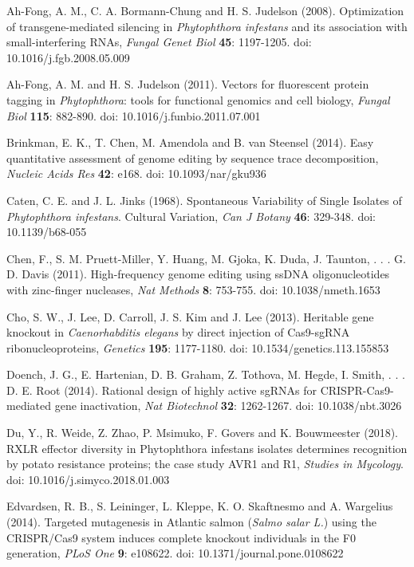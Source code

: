 \documentclass[onecolumn, 11pt,openany]{memoir}
\begin{document}
\begin{multicols}{2}
\begin{sloppy}
\begin{footnotesize}
Ah-Fong, A. M., C. A. Bormann-Chung and H. S. Judelson (2008). Optimization of transgene-mediated silencing in \textit{Phytophthora infestans} and its association with small-interfering RNAs, \textit{Fungal Genet Biol} \textbf{45}: 1197-1205. doi: 10.1016/j.fgb.2008.05.009

Ah-Fong, A. M. and H. S. Judelson (2011). Vectors for fluorescent protein tagging in \textit{Phytophthora}: tools for functional genomics and cell biology, \textit{Fungal Biol} \textbf{115}: 882-890. doi: 10.1016/j.funbio.2011.07.001

Brinkman, E. K., T. Chen, M. Amendola and B. van Steensel (2014). Easy quantitative assessment of genome editing by sequence trace decomposition, \textit{Nucleic Acids Res} \textbf{42}: e168. doi: 10.1093/nar/gku936

Caten, C. E. and J. L. Jinks (1968). Spontaneous Variability of Single Isolates of \textit{Phytophthora infestans}. Cultural Variation, \textit{Can J Botany} \textbf{46}: 329-348. doi: 10.1139/b68-055

Chen, F., S. M. Pruett-Miller, Y. Huang, M. Gjoka, K. Duda, J. Taunton, . . . G. D. Davis (2011). High-frequency genome editing using ssDNA oligonucleotides with zinc-finger nucleases, \textit{Nat Methods} \textbf{8}: 753-755. doi: 10.1038/nmeth.1653

Cho, S. W., J. Lee, D. Carroll, J. S. Kim and J. Lee (2013). Heritable gene knockout in \textit{Caenorhabditis elegans} by direct injection of Cas9-sgRNA ribonucleoproteins, \textit{Genetics} \textbf{195}: 1177-1180. doi: 10.1534/genetics.113.155853

Doench, J. G., E. Hartenian, D. B. Graham, Z. Tothova, M. Hegde, I. Smith, . . . D. E. Root (2014). Rational design of highly active sgRNAs for CRISPR-Cas9-mediated gene inactivation, \textit{Nat Biotechnol} \textbf{32}: 1262-1267. doi: 10.1038/nbt.3026

Du, Y., R. Weide, Z. Zhao, P. Msimuko, F. Govers and K. Bouwmeester (2018). RXLR effector diversity in Phytophthora infestans isolates determines recognition by potato resistance proteins; the case study AVR1 and R1, \textit{Studies in Mycology}. doi: 10.1016/j.simyco.2018.01.003

Edvardsen, R. B., S. Leininger, L. Kleppe, K. O. Skaftnesmo and A. Wargelius (2014). Targeted mutagenesis in Atlantic salmon (\textit{Salmo salar L.}) using the CRISPR/Cas9 system induces complete knockout individuals in the F0 generation, \textit{PLoS One} \textbf{9}: e108622. doi: 10.1371/journal.pone.0108622


\end{footnotesize}
\end{sloppy}
\end{multicols}
\end{document}
